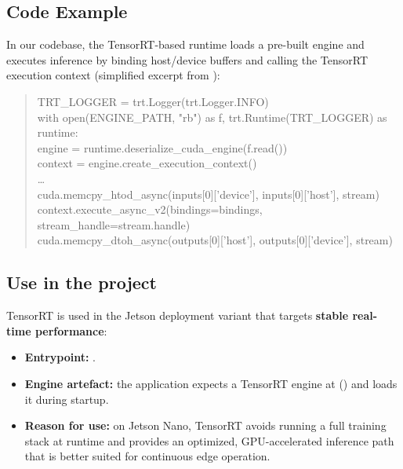 \subsection{Code Example}

\noindent
In our codebase, the TensorRT-based runtime loads a pre-built engine and executes inference by binding host/device buffers and calling the TensorRT execution context (simplified excerpt from ):
\begin{quote}\ttfamily
	TRT\_LOGGER = trt.Logger(trt.Logger.INFO)\\
	with open(ENGINE\_PATH, "rb") as f, trt.Runtime(TRT\_LOGGER) as runtime:\\
	\hspace*{1.6em}engine = runtime.deserialize\_cuda\_engine(f.read())\\
	\hspace*{1.6em}context = engine.create\_execution\_context()\\
	\ldots\\
	cuda.memcpy\_htod\_async(inputs[0]['device'], inputs[0]['host'], stream)\\
	context.execute\_async\_v2(bindings=bindings, stream\_handle=stream.handle)\\
	cuda.memcpy\_dtoh\_async(outputs[0]['host'], outputs[0]['device'], stream)
\end{quote}

\subsection{Use in the project}

\noindent
TensorRT is used in the Jetson deployment variant that targets \textbf{stable real-time performance}:
\begin{itemize}
	\item \textbf{Entrypoint:} .
	\item \textbf{Engine artefact:} the application expects a TensorRT engine at  () and loads it during startup.
	\item \textbf{Reason for use:} on Jetson Nano, TensorRT avoids running a full training stack at runtime and provides an optimized, GPU-accelerated inference path that is better suited for continuous edge operation.
\end{itemize}
